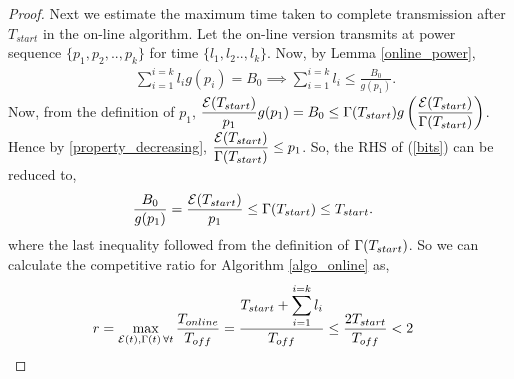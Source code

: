 \begin{proof}
%

Next we estimate the maximum time taken to complete transmission after $T_{start}$ in the on-line algorithm. Let the on-line version transmits at power sequence $\{p_1,p_2,..,p_k\}$ for time $\{l_1,l_2..,l_k\} $. Now, by Lemma \ref{online_power},
\begin{align}
&\sum_{i=1}^{i=k}l_ig(p_i)=B_0\implies\sum_{i=1}^{i=k}l_i\le \frac{B_0}{g(p_1)}.\label{bits}
\end{align}
Now, from the definition of $p_1$, $\dfrac{\mathcal{E}(T_{start})}{p_1}g(p_1)=B_0 \le \Gamma(T_{start}) g\left( \dfrac{\mathcal{E}(T_{start})}{\Gamma(T_{start})} \right)$. Hence by \eqref{property_decreasing}, $\dfrac{\mathcal{E}(T_{start})}{\Gamma(T_{start})}\le p_1$.\vspace{2pt}
So, the RHS of (\ref{bits}) can be reduced to, 
\begin{align}
&\frac{B_0}{g(p_1)} = \frac{\mathcal{E}(T_{start})}{p_1} \le \Gamma(T_{start})\le T_{start}.
\end{align}
where the last inequality followed from the definition of $\Gamma(T_{start})$. So we can calculate the competitive ratio for Algorithm \ref{algo_online} as,
\begin{align*}
&r=\displaystyle\max_{\mathcal{E}(t),\Gamma(t)\hspace{0.5mm} \forall t}\dfrac{T_{online}}{T_{off}} = \dfrac{T_{start}+\displaystyle\sum_{i=1}^{i=k}l_i}{T_{off}} \le \dfrac{2 T_{start}}{T_{off}} < 2
\end{align*}
\end{proof}
